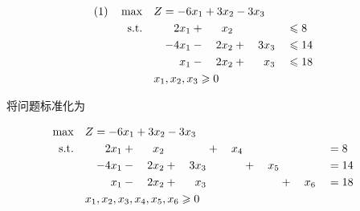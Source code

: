 \begin{alignat*}{20}
\text{(1)\quad}\max\quad &\rlap{$Z=\mbox{$-$}6x_1+3x_2-3x_3$}\\
\text{s.t.\quad}
&&2x_1&{}+{}&x_2&&&&{}\leqslant{}&8\\
&&\mbox{$-$}4x_1&{}-{}&2x_2&{}+{}&3x_3&&{}\leqslant{}&14\\
&&x_1&{}-{}&2x_2&{}+{}&x_3&&{}\leqslant{}&18\\
\rlap{$x_1,x_2,x_3\geqslant0$}
\end{alignat*}

\begin{mdframed}
\jie 将问题标准化为

\begin{alignat*}{20}
\max\quad &\rlap{$Z=\mbox{$-$}6x_1+3x_2-3x_3$}\\
\text{s.t.\quad}
&&2	x_1&	{}+{}&	x_2&	&	&	{}+{}&	x_4&	&	&	&	&	&{}={}&8\\
&&\mbox{$-$}4	x_1&	{}-{}&2	x_2&	{}+{}&3	x_3&	&	&	{}+{}&	x_5&	&	&	&{}={}&14\\
&&	x_1&	{}-{}&2	x_2&	{}+{}&	x_3&	&	&	&	&	{}+{}&	x_6&	&{}={}&18\\
\rlap{$x_1,x_2,x_3,x_4,x_5,x_6\geqslant0$}
\end{alignat*}


\end{mdframed}
